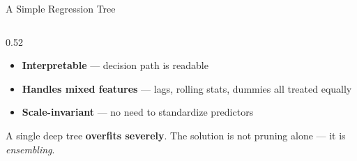\documentclass[aspectratio=169, 10pt]{beamer}
\begin{document}
\begin{frame}{A Simple Regression Tree}
\begin{columns}[T]
\begin{column}{0.52\textwidth}
\begin{itemize}
        \item \textbf{Interpretable} — decision path is readable
        \item \textbf{Handles mixed features} — lags, rolling stats, dummies
              all treated equally
        \item \textbf{Scale-invariant} — no need to standardize predictors
      \end{itemize}
      \medskip
      \begin{warningbox}
        A single deep tree \textbf{overfits severely}.
        The solution is not pruning alone — it is \emph{ensembling}.
      \end{warningbox}
    \end{column}
  \end{columns}
\end{frame}
\end{document}
